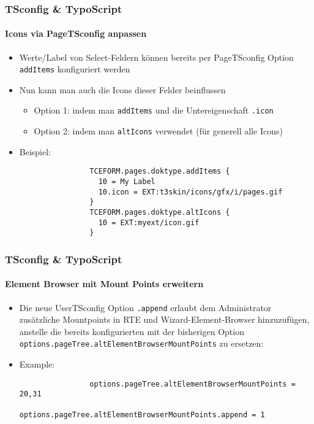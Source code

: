 \begin{frame}[fragile]
	\frametitle{TSconfig \& TypoScript}
	\framesubtitle{Icons via PageTSconfig anpassen}

	\begin{itemize}
		\item Werte/Label von Select-Feldern können bereits per PageTSconfig Option \texttt{addItems} konfiguriert werden
		\item Nun kann man auch die Icons dieser Felder beinflussen

			\begin{itemize}
				\item Option 1: indem man \texttt{addItems} und die Untereigenschaft \texttt{.icon}
				\item Option 2: indem man \texttt{altIcons} verwendet (für generell alle Icons)
			\end{itemize}

		\item Beispiel:

			\begin{lstlisting}
				TCEFORM.pages.doktype.addItems {
				  10 = My Label
				  10.icon = EXT:t3skin/icons/gfx/i/pages.gif
				}
				TCEFORM.pages.doktype.altIcons {
				  10 = EXT:myext/icon.gif
				}
			\end{lstlisting}

	\end{itemize}

\end{frame}


\begin{frame}[fragile]
	\frametitle{TSconfig \& TypoScript}
	\framesubtitle{Element Browser mit Mount Points erweitern}

	\begin{itemize}
		\item Die neue UserTSconfig Option \texttt{.append} erlaubt dem Administrator zusätzliche Mountpoints in RTE und Wizard-Element-Browser hinzuzufügen, anstelle die bereits konfigurierten mit der bisherigen Option \texttt{options.pageTree.altElementBrowserMountPoints} zu ersetzen:
		\item Example:

			\begin{lstlisting}
				options.pageTree.altElementBrowserMountPoints = 20,31
				options.pageTree.altElementBrowserMountPoints.append = 1
			\end{lstlisting}
	\end{itemize}

\end{frame}

